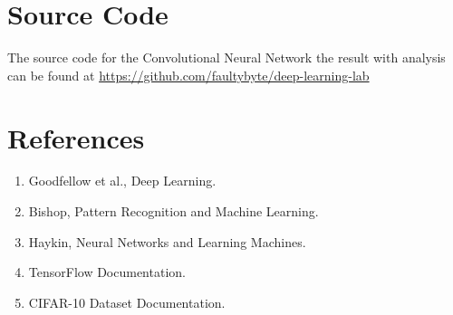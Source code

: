 \documentclass[11pt]{article}
\begin{document}
\section{Source Code}
The source code for the Convolutional Neural Network the result with analysis can be found at \url{https://github.com/faultybyte/deep-learning-lab}

\section{References}
\begin{enumerate}
    \item Goodfellow et al., Deep Learning. 
    \item Bishop, Pattern Recognition and Machine Learning. 
    \item Haykin, Neural Networks and Learning Machines. 
    \item TensorFlow Documentation. 
    \item CIFAR-10 Dataset Documentation. 
\end{enumerate}
\end{document}
